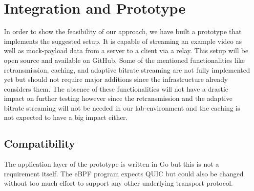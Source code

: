 \section{Integration and Prototype}\label{sec:integration_and_prototype}

In order to show the feasibility of our approach, we have built a prototype 
that implements the suggested setup.
It is capable of streaming an example video as well as mock-payload data from 
a server to a client via a relay.
This setup will be open source and available on GitHub.
Some of the mentioned functionalities like retransmission, caching, and adaptive
bitrate streaming are not fully implemented yet but should not require major
additions since the infrastructure already considers them.
The absence of these functionalities will not have a drastic impact on further 
testing however since the retransmission and the adaptive bitrate streaming will not
be needed in our lab-environment and the caching is not expected to have a big impact
either.

\subsection{Compatibility}
The application layer of the prototype is written in Go but this is not a requirement
itself.
The eBPF program expects QUIC but could also be changed without too much effort to
support any other underlying transport protocol.

